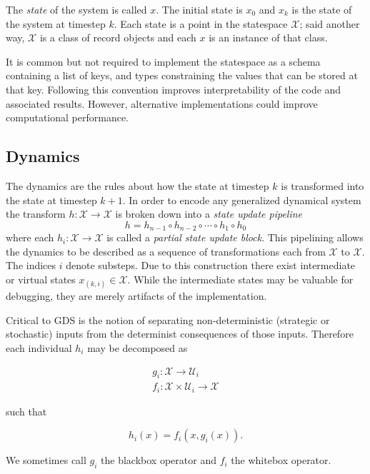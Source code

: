 \documentclass[]{article}
\begin{document}
The \emph{state} of the system is called \(x\). The initial state is
\(x_0\) and \(x_k\) is the state of the system at timestep \(k\). Each
state is a point in the statespace \(\mathcal{X}\); said another way,
\(\mathcal{X}\) is a class of record objects and each \(x\) is an
instance of that class.

It is common but not required to implement the statespace as a schema
containing a list of keys, and types constraining the values that can be
stored at that key. Following this convention improves interpretability
of the code and associated results. However, alternative implementations
could improve computational performance.

\hypertarget{dynamics}{%
\subsection{Dynamics}\label{dynamics}}

The dynamics are the rules about how the state at timestep \(k\) is
transformed into the state at timestep \(k+1\). In order to encode any
generalized dynamical system the transform
\(h:\mathcal{X}\rightarrow \mathcal{X}\) is broken down into a
\emph{state update pipeline} \[
h = h_{n-1} \circ h_{n-2} \circ \cdots \circ h_1 \circ h_0
\] where each \(h_i: \mathcal{X}\rightarrow \mathcal{X}\) is called a
\emph{partial state update block}. This pipelining allows the dynamics
to be described as a sequence of transformations each from
\(\mathcal{X}\) to \(\mathcal{X}\). The indices \(i\) denote substeps.
Due to this construction there exist intermediate or virtual states
\(x_{(k,i)}\in \mathcal{X}\). While the intermediate states may be
valuable for debugging, they are merely artifacts of the implementation.

Critical to GDS is the notion of separating non-deterministic (strategic
or stochastic) inputs from the determinist consequences of those inputs.
Therefore each individual \(h_i\) may be decomposed as

\[ \begin{array}{c}g_i:\mathcal{X} \rightarrow \mathcal{U}_i\\
f_i:\mathcal{X}\times \mathcal{U}_i \rightarrow \mathcal{X}\end{array}\]

such that

\[ h_i(x)= f_i(x, g_i(x)). \]

We sometimes call \(g_i\) the blackbox operator and \(f_i\) the whitebox
operator.
\end{document}
